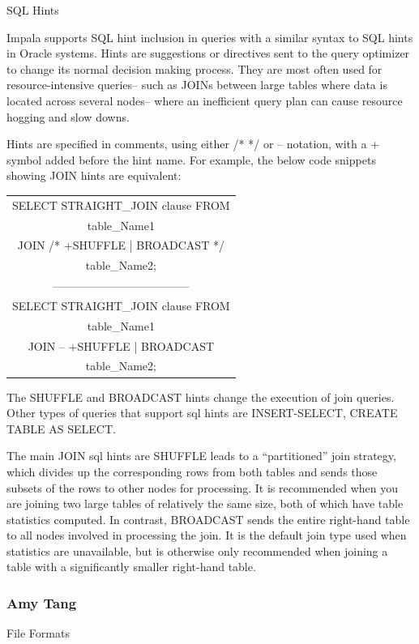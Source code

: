 \documentclass[onecolumn, draftclsnofoot,10pt, compsoc]{IEEEtran}
\begin{document}
SQL Hints 

Impala supports SQL hint inclusion in queries with a similar syntax to SQL hints in Oracle systems.
Hints are suggestions or directives sent to the query optimizer to change its normal decision making process. 
They are most often used for resource-intensive queries--  such as JOINs between large tables where data is located across several nodes-- where an inefficient query plan can cause resource hogging and slow downs. 

Hints are specified in comments, using either  /* */ or -- notation, with a + symbol added before the hint name.
For example, the below code snippets showing JOIN hints are equivalent:
\begin{center}
\begin{tabular}{ |c| }
    \hline
    SELECT STRAIGHT\_JOIN clause FROM \\
    table\_Name1 \\
    JOIN  /* +SHUFFLE | BROADCAST */ \\
    table\_Name2; \\
    ------------------------------------ \\
    SELECT STRAIGHT\_JOIN clause FROM \\
    table\_Name1 \\
    JOIN  -- +SHUFFLE | BROADCAST \\
    table\_Name2;     \\
    \hline
\end{tabular}
\end{center}

The SHUFFLE and BROADCAST hints change the execution of join queries.
Other types of queries that support sql hints are INSERT-SELECT, CREATE TABLE AS SELECT.

The main JOIN sql hints are SHUFFLE leads to a “partitioned” join strategy, which divides up the corresponding rows from both tables and sends those subsets of the rows to other nodes for processing.
It is recommended when you are joining two large tables of relatively the same size, both of which have table statistics computed.
In contrast, BROADCAST sends the entire right-hand table to all nodes involved in processing the join.
It is the default join type used when statistics are unavailable, but is otherwise only recommended when joining a table with a significantly smaller right-hand table. 

\subsubsection{Amy Tang}
File Formats
\end{document}
